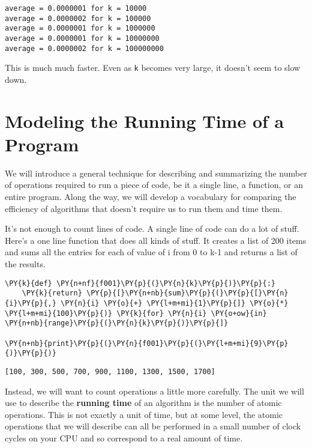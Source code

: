 \begin{Verbatim}
average = 0.0000001 for k = 10000
average = 0.0000002 for k = 100000
average = 0.0000001 for k = 1000000
average = 0.0000001 for k = 10000000
average = 0.0000002 for k = 100000000
\end{Verbatim}


This is much much faster.
Even as \texttt{k} becomes very large, it doesn't seem to slow down.

\section{Modeling the Running Time of a Program}


We will introduce a general technique for describing and summarizing the number of operations required to run a piece of code, be it a single line, a function, or an entire program.
Along the way, we will develop a vocabulary for comparing the efficiency of algorithms that doesn't require us to run them and time them.


It's not enough to count lines of code.
A single line of code can do a lot of stuff.
Here's a one line function that does all kinds of stuff.
It creates a list of 200 items and sums all the entries for each of value of i from 0 to k-1 and returns a list of the results.


\begin{Verbatim}[commandchars=\\\{\}]
\PY{k}{def} \PY{n+nf}{f001}\PY{p}{(}\PY{n}{k}\PY{p}{)}\PY{p}{:}
    \PY{k}{return} \PY{p}{[}\PY{n+nb}{sum}\PY{p}{(}\PY{p}{[}\PY{n}{i}\PY{p}{,} \PY{n}{i} \PY{o}{+} \PY{l+m+mi}{1}\PY{p}{]} \PY{o}{*} \PY{l+m+mi}{100}\PY{p}{)} \PY{k}{for} \PY{n}{i} \PY{o+ow}{in} \PY{n+nb}{range}\PY{p}{(}\PY{n}{k}\PY{p}{)}\PY{p}{]}

\PY{n+nb}{print}\PY{p}{(}\PY{n}{f001}\PY{p}{(}\PY{l+m+mi}{9}\PY{p}{)}\PY{p}{)}
\end{Verbatim}

\begin{Verbatim}
[100, 300, 500, 700, 900, 1100, 1300, 1500, 1700]
\end{Verbatim}


Instead, we will want to count operations a little more carefully.
The unit we will use to describe the \textbf{running time} of an algorithm is the number of atomic operations.
This is not exactly a unit of time, but at some level, the atomic operations that we will describe can all be performed in a small number of clock cycles on your CPU and so correspond to a real amount of time.


